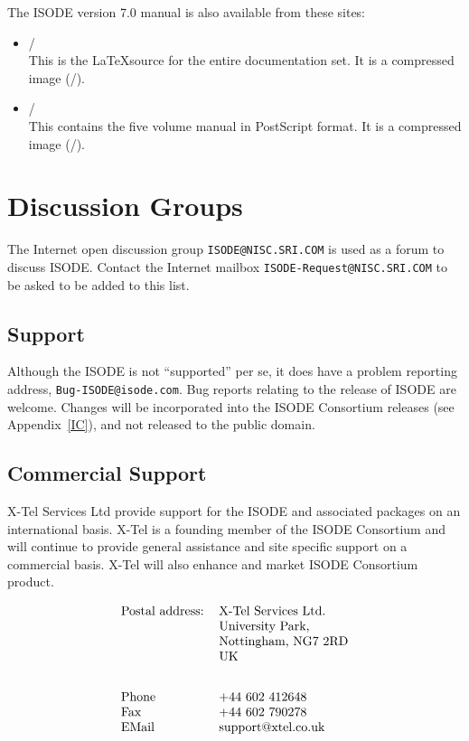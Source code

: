 The ISODE version 7.0 manual is also available from these sites:

\begin{itemize}

\item  \Docfile/\\
This is the \LaTeX source for the entire documentation set.
It is a compressed  image (\DocSize/).

\item  \PSfile/\\
This contains the five volume manual in PostScript format.
It is a compressed  image (\PSsize/).

\end{itemize}


\newpage\section*	{Discussion Groups}
The Internet open discussion group {\tt ISODE@NISC.SRI.COM\/} is
used as a forum to discuss ISODE.
Contact the Internet mailbox {\tt ISODE-Request@NISC.SRI.COM\/}
to be asked to be added to this list.

\subsection*{Support}
Although the ISODE is not ``supported'' per se, it does have a problem
reporting address, {\tt Bug-ISODE@isode.com\/}.  
Bug reports relating to the release of ISODE are
welcome.   Changes will be incorporated into the ISODE Consortium
releases (see Appendix~\ref{IC}), and not released to the public domain.  

\subsection*{Commercial Support}
X-Tel Services Ltd provide support for the ISODE and associated
packages on an international basis.  X-Tel is a founding member of
the ISODE Consortium and will continue to provide general
assistance and site specific support on a commercial basis.  
X-Tel will also enhance and market ISODE Consortium product. 

\[\begin{tabular}{ll}
Postal address:&	X-Tel Services Ltd.\\
&	University Park,\\
&	Nottingham, NG7 2RD\\
&        UK\\[2em]
Phone&		+44 602 412648\\
Fax&		+44 602 790278\\
EMail&	support@xtel.co.uk\\
\end{tabular}\]

